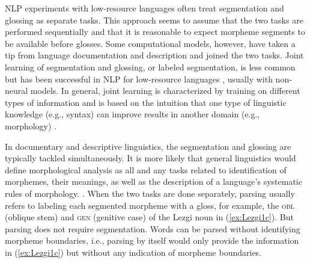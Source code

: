 NLP experiments with low-resource languages often treat segmentation and glossing as separate tasks. This approach seems to assume that the two tasks are performed sequentially and that it is reasonable to expect morpheme segments to be available before glosses. 
Some computational models, however, have taken a tip from language documentation and description and joined the two tasks.
Joint learning of segmentation and glossing, or labeled segmentation, is less common but has been successful in NLP for low-resource languages \citep{cotterell_labeled_2015,moeller_automatic_2018}, usually with non-neural models. In general, joint learning is characterized by training on different types of information and is based on the intuition that one type of linguistic knowledge (e.g., syntax) can improve results in another domain (e.g., morphology) \citep{goldsmith_computational_2017}. 
 
In documentary and descriptive linguistics, the segmentation and glossing are typically tackled simultaneously. It is more likely that general linguistics would define morphological analysis as all and any tasks related to identification of morphemes, their meanings, as well as the description of a language’s systematic rules of morphology. 
\citep{cotterell_labeled_2015}. When the two tasks are done separately, parsing usually refers to labeling each segmented morpheme with a gloss, for example, the \textsc{obl} (oblique stem) and \textsc{gen} (genitive case) of the Lezgi noun in (\ref{ex:Lezgi1c}). But parsing does not require segmentation. %
Words can be parsed without identifying morpheme boundaries, i.e., parsing by itself would only provide the information in (\ref{ex:Lezgi1c}) but without any indication of morpheme boundaries. %

